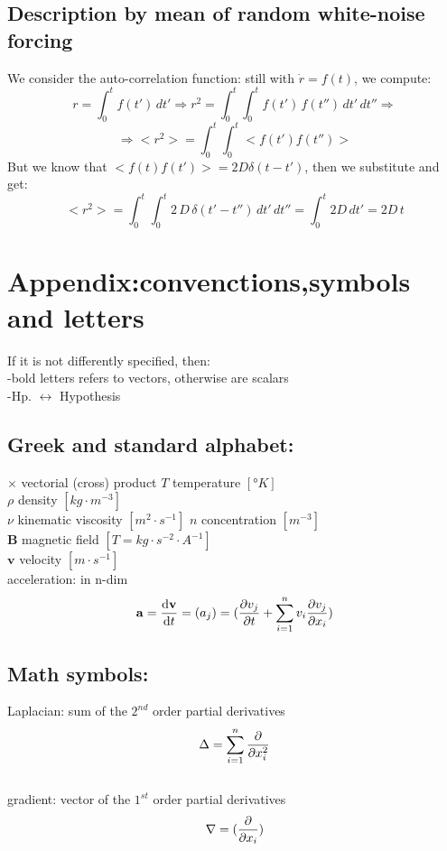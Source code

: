 \documentclass[a4paper,11pt]{article}
\begin{document}
\subsection{Description by mean of random white-noise forcing}
We consider the auto-correlation function: still with $\dot{r}=f(t)$, we compute:
\[  r=\int_{0}^{t} f(t')\,dt' \Rightarrow r^2=\int_{0}^{t} \int_{0}^{t} f(t')\,f(t'')\,dt'\,dt'' \Rightarrow  \]
\[   \Rightarrow <r^2>=\int_{0}^{t}\int_{0}^{t} <f(t')f(t'')>    \]
But we know that $<f(t)f(t')>=2D \delta (t-t')$, then we substitute and get:
\[ <r^2>=\int_{0}^{t}\int_{0}^{t}2\,D\, \delta(t'-t'')\,dt'\,dt''= \int_{0}^{t} 2D\,dt'=2D\,t\]

 
 
 
 
 
 
 
 
 
 
 
 
 
 
 
 
 \section{Appendix:convenctions,symbols and letters}
 If it is not differently specified, then:\\
 -bold letters refers to vectors, otherwise are scalars\\
 -Hp. $\leftrightarrow$ Hypothesis\\

	 \subsection{Greek and standard alphabet:}
$\times$ vectorial (cross) product
 $T$ temperature $[°K]$\\
 $\rho$ density $[kg \cdot m^{-3}]$\\
 $\nu$ kinematic viscosity $[m^2 \cdot s^{-1}]$
 $n$ concentration $[m^{-3}]$\\
 $\mathbf{B}$ magnetic field $[T=kg\cdot s^{-2}\cdot A^{-1}]$ \\
  $\mathbf{v}$ velocity $[m \cdot s^{-1}]$\\
 acceleration: in n-dim
 \[ \mathbf{a}= \dv{\mathbf{v}}{t}=(a_j)=(\pdv{v_j}{t}+ \sum_{i=1}^{n} v_i \pdv{v_j}{x_i} ) \]
 
 
 	\subsection{Math symbols:} %
 	
 Laplacian: sum of the $2^{nd}$ order partial derivatives\\
 \[ \Delta=\sum_{i=1}^{n} \pdv{}{x^2_i} \]  \\
 gradient: vector of the $1^{st}$ order partial derivatives\\
 \[ \nabla= (\pdv{}{x_i}) \]  \\
 
\end{document}
